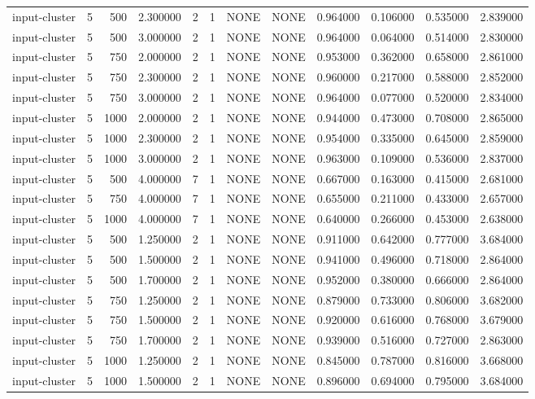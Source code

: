 \begin{tabular}{lrrrllllrrrr}
input-cluster & 5 & 500 & 2.300000 & 2 & 1 & NONE & NONE & 0.964000 & 0.106000 & 0.535000 & 2.839000 \\
input-cluster & 5 & 500 & 3.000000 & 2 & 1 & NONE & NONE & 0.964000 & 0.064000 & 0.514000 & 2.830000 \\
input-cluster & 5 & 750 & 2.000000 & 2 & 1 & NONE & NONE & 0.953000 & 0.362000 & 0.658000 & 2.861000 \\
input-cluster & 5 & 750 & 2.300000 & 2 & 1 & NONE & NONE & 0.960000 & 0.217000 & 0.588000 & 2.852000 \\
input-cluster & 5 & 750 & 3.000000 & 2 & 1 & NONE & NONE & 0.964000 & 0.077000 & 0.520000 & 2.834000 \\
input-cluster & 5 & 1000 & 2.000000 & 2 & 1 & NONE & NONE & 0.944000 & 0.473000 & 0.708000 & 2.865000 \\
input-cluster & 5 & 1000 & 2.300000 & 2 & 1 & NONE & NONE & 0.954000 & 0.335000 & 0.645000 & 2.859000 \\
input-cluster & 5 & 1000 & 3.000000 & 2 & 1 & NONE & NONE & 0.963000 & 0.109000 & 0.536000 & 2.837000 \\
input-cluster & 5 & 500 & 4.000000 & 7 & 1 & NONE & NONE & 0.667000 & 0.163000 & 0.415000 & 2.681000 \\
input-cluster & 5 & 750 & 4.000000 & 7 & 1 & NONE & NONE & 0.655000 & 0.211000 & 0.433000 & 2.657000 \\
input-cluster & 5 & 1000 & 4.000000 & 7 & 1 & NONE & NONE & 0.640000 & 0.266000 & 0.453000 & 2.638000 \\
input-cluster & 5 & 500 & 1.250000 & 2 & 1 & NONE & NONE & 0.911000 & 0.642000 & 0.777000 & 3.684000 \\
input-cluster & 5 & 500 & 1.500000 & 2 & 1 & NONE & NONE & 0.941000 & 0.496000 & 0.718000 & 2.864000 \\
input-cluster & 5 & 500 & 1.700000 & 2 & 1 & NONE & NONE & 0.952000 & 0.380000 & 0.666000 & 2.864000 \\
input-cluster & 5 & 750 & 1.250000 & 2 & 1 & NONE & NONE & 0.879000 & 0.733000 & 0.806000 & 3.682000 \\
input-cluster & 5 & 750 & 1.500000 & 2 & 1 & NONE & NONE & 0.920000 & 0.616000 & 0.768000 & 3.679000 \\
input-cluster & 5 & 750 & 1.700000 & 2 & 1 & NONE & NONE & 0.939000 & 0.516000 & 0.727000 & 2.863000 \\
input-cluster & 5 & 1000 & 1.250000 & 2 & 1 & NONE & NONE & 0.845000 & 0.787000 & 0.816000 & 3.668000 \\
input-cluster & 5 & 1000 & 1.500000 & 2 & 1 & NONE & NONE & 0.896000 & 0.694000 & 0.795000 & 3.684000 \\

\end{tabular}
